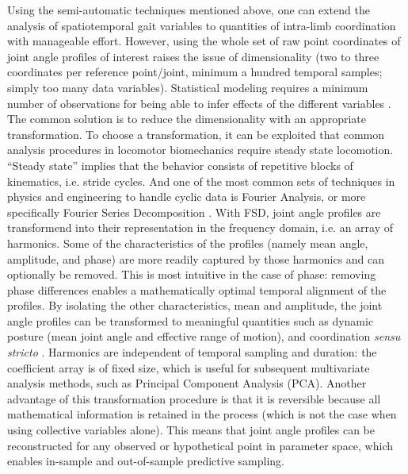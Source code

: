 Using the semi-automatic  techniques mentioned above, one can extend the analysis of spatiotemporal gait variables to quantities of intra-limb coordination with manageable effort.
However, using the whole set of raw point coordinates of joint angle profiles of interest raises the issue of dimensionality (two to three coordinates per reference point/joint, minimum a hundred temporal samples; simply too many data variables).
Statistical modeling requires a minimum number of observations for being able to infer effects of the different variables \citep{Frick1996,Maxwell2017,Riley2020,Austin2015}.
The common solution is to reduce the dimensionality with an appropriate transformation.
To choose a transformation, it can be exploited that common analysis procedures in locomotor biomechanics require steady state locomotion.
``Steady state'' implies that the behavior consists of repetitive blocks of kinematics, i.e. stride cycles.
And one of the most common sets of techniques in physics and engineering to handle cyclic data is Fourier Analysis, or more specifically Fourier Series Decomposition \citep[FSD;][]{Mielke2019,Webb2007,Fourier1822,Bracewell2000,Gray1995,Pike2002}.
With FSD, joint angle profiles are transformend into their representation in the frequency domain, i.e. an array of harmonics.
Some of the characteristics of the profiles (namely mean  angle, amplitude, and phase) are more readily captured by those harmonics and can optionally be removed.
This is most intuitive in the case of phase: removing phase differences enables a mathematically optimal temporal alignment of the profiles.
By isolating the other characteristics, mean and amplitude, the joint angle profiles can be transformed to meaningful quantities such as dynamic posture (mean joint angle and effective range of motion), and coordination \emph{sensu stricto} \citep[relative phase/joint timing and residual kinematics, \textit{cf.}][and Ch. \ref{cpt:fourier_review}]{Mielke2019}.
Harmonics are independent of temporal sampling and duration: the coefficient array is of fixed size, which is useful for subsequent multivariate analysis methods, such as Principal Component Analysis (PCA).
Another advantage of this transformation procedure is that it is reversible because all mathematical information is retained in the process (which is not the case when using collective variables alone).
This means that joint angle profiles can be reconstructed for any observed or hypothetical point in parameter space, which enables in-sample and out-of-sample predictive sampling.

